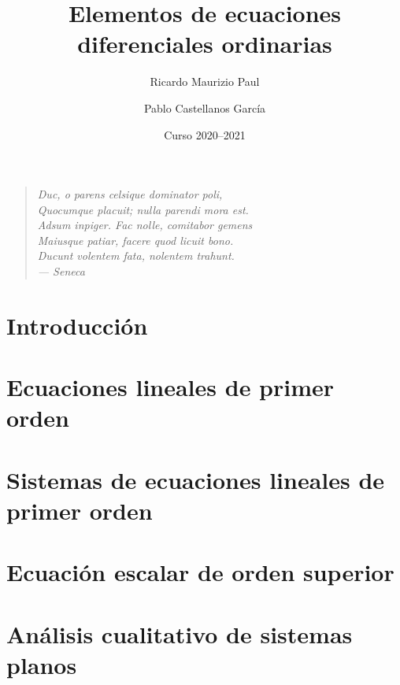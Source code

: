 \documentclass[a4paper, 10pt, openany]{book}
\title{Elementos de ecuaciones diferenciales ordinarias}
\author{Ricardo Maurizio Paul \and Pablo Castellanos García}
\date{Curso 2020--2021}
\makeatletter
\renewcommand\mainmatter{
    \@mainmattertrue\cleardoublepage\renewcommand\thepage{\arabic{page}}}
\makeatother
\begin{document}
\frontmatter

\maketitle

\clearpage
\vspace*{\fill}
\thispagestyle{empty} %
\begin{quotation}
\raggedleft
\em %
Duc, o parens celsique dominator poli, \\
Quocumque placuit; nulla parendi mora est. \\
Adsum inpiger. Fac nolle, comitabor gemens \\
Maiusque patiar, facere quod licuit bono. \\
Ducunt volentem fata, nolentem trahunt. \\
\bigskip
--- Seneca
\end{quotation}
\vspace*{\fill}

\tableofcontents


\mainmatter

\chapter{Introducción}


\chapter{Ecuaciones lineales de primer orden}
\label{CHAP:1}


\chapter{Sistemas de ecuaciones lineales de primer orden}
\label{CHAP:2}


\chapter{Ecuación escalar de orden superior}
\label{CHAP:3}


\chapter{Análisis cualitativo de sistemas planos}
\label{CHAP:4}

\end{document}
